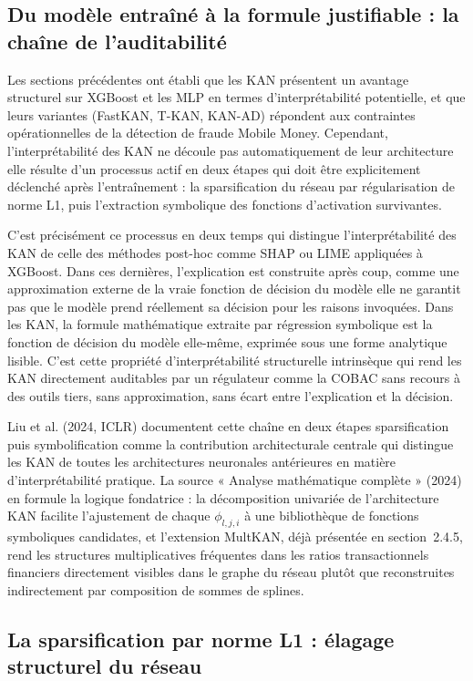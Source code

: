 \documentclass[11pt,a4paper,oneside]{report}
\theoremstyle{definition}
\theoremstyle{remark}
\begin{document}
\subsection{Du modèle entraîné à la formule justifiable : la chaîne de l'auditabilité}

Les sections précédentes ont établi que les KAN présentent un avantage structurel sur XGBoost et les MLP en termes d'interprétabilité potentielle, et que leurs variantes (FastKAN, T-KAN, KAN-AD) répondent aux contraintes opérationnelles de la détection de fraude Mobile Money. Cependant, l'interprétabilité des KAN ne découle pas automatiquement de leur architecture  elle résulte d'un processus actif en deux étapes qui doit être explicitement déclenché après l'entraînement : la sparsification du réseau par régularisation de norme L1, puis l'extraction symbolique des fonctions d'activation survivantes.

C'est précisément ce processus en deux temps qui distingue l'interprétabilité des KAN de celle des méthodes post-hoc comme SHAP ou LIME appliquées à XGBoost. Dans ces dernières, l'explication est construite après coup, comme une approximation externe de la vraie fonction de décision du modèle  elle ne garantit pas que le modèle prend réellement sa décision pour les raisons invoquées. Dans les KAN, la formule mathématique extraite par régression symbolique est la fonction de décision du modèle elle-même, exprimée sous une forme analytique lisible. C'est cette propriété d'interprétabilité structurelle intrinsèque qui rend les KAN directement auditables par un régulateur comme la COBAC  sans recours à des outils tiers, sans approximation, sans écart entre l'explication et la décision.

Liu et al. (2024, ICLR) documentent cette chaîne en deux étapes  sparsification puis symbolification  comme la contribution architecturale centrale qui distingue les KAN de toutes les architectures neuronales antérieures en matière d'interprétabilité pratique. La source « Analyse mathématique complète » (2024) en formule la logique fondatrice : la décomposition univariée de l'architecture KAN facilite l'ajustement de chaque $\phi_{l,j,i}$ à une bibliothèque de fonctions symboliques candidates, et l'extension MultKAN, déjà présentée en section~2.4.5, rend les structures multiplicatives  fréquentes dans les ratios transactionnels financiers  directement visibles dans le graphe du réseau plutôt que reconstruites indirectement par composition de sommes de splines.

\subsection{La sparsification par norme L1 : élagage structurel du réseau}
\end{document}
